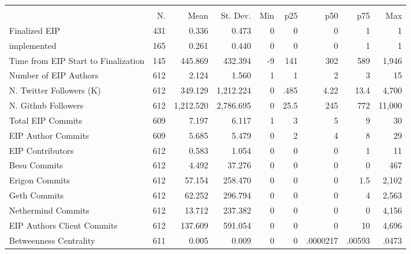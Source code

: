 {
\def\sym#1{\ifmmode^{#1}\else\(^{#1}\)\fi}
\begin{tabular}{l*{1}{rrrrrrrr}}
\hline\hline
                    &\multicolumn{8}{c}{}                                                                                   \\
                    &          N.&        Mean&    St. Dev.&         Min&         p25&         p50&         p75&         Max\\
\hline
Finalized EIP       &         431&       0.336&       0.473&           0&           0&           0&           1&           1\\
implemented         &         165&       0.261&       0.440&           0&           0&           0&           1&           1\\
Time from EIP Start to Finalization&         145&     445.869&     432.394&          -9&         141&         302&         589&       1,946\\
Number of EIP Authors&         612&       2.124&       1.560&           1&           1&           2&           3&          15\\
N. Twitter Followers (K)&         612&     349.129&   1,212.224&           0&        .485&        4.22&        13.4&       4,700\\
N. Github Followers &         612&   1,212.520&   2,786.695&           0&        25.5&         245&         772&      11,000\\
Total EIP Commits   &         609&       7.197&       6.117&           1&           3&           5&           9&          30\\
EIP Author Commits  &         609&       5.685&       5.479&           0&           2&           4&           8&          29\\
EIP Contributors    &         612&       0.583&       1.054&           0&           0&           0&           1&          11\\
Besu Commits        &         612&       4.492&      37.276&           0&           0&           0&           0&         467\\
Erigon Commits      &         612&      57.154&     258.470&           0&           0&           0&         1.5&       2,102\\
Geth Commits        &         612&      62.252&     296.794&           0&           0&           0&           4&       2,563\\
Nethermind Commits  &         612&      13.712&     237.382&           0&           0&           0&           0&       4,156\\
EIP Authors Client Commits&         612&     137.609&     591.054&           0&           0&           0&          10&       4,696\\
Betweenness Centrality&         611&       0.005&       0.009&           0&           0&    .0000217&      .00593&       .0473\\
\hline\hline
\end{tabular}
}
